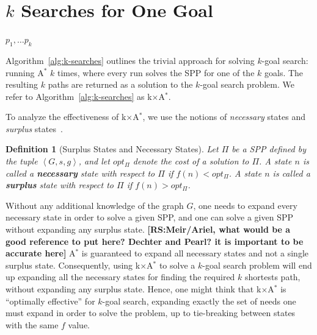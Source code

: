 \documentclass{aicom2e}
\newtheorem{definition}{Definition}
\newcommand{\kgs}{$k$-goal search}
\newcommand{\astar}{A$^*$}
\newcommand{\kxastar}{k$\times$A$^*$}
\newcommand{\tuple}[1]{\ensuremath{\left \langle #1 \right \rangle }}
\newcommand{\roni}[1]{\textbf{[RS:#1]}}
\begin{document}
\section{$k$ Searches for One Goal}
\label{sec:k-one-goal}
\begin{algorithm2e}[t!]
	\small
	\For{$i$=1 to $k$}{
		$p_i\gets$ \astar{}($s$,$g_i$)\\
	}
	\Return $p_1,\ldots p_k$\\	
	\caption{\kxastar{}: \kgs{} with $k$ \astar{}s}
	\label{alg:k-searches}
\end{algorithm2e}



Algorithm~\ref{alg:k-searches} outlines the trivial approach for solving \kgs{}: running \astar{} $k$ times, where every run solves the SPP for one of the $k$ goals. The resulting $k$ paths are returned as a solution to the \kgs{} problem. We refer to Algorithm~\ref{alg:k-searches} as \kxastar{}. 


To analyze the effectiveness of \kxastar{}, we use the notions of {\em necessary} states and {\em surplus} states~\cite{goldenberg2014enhanced}. 

\begin{definition}[Surplus States and Necessary States]
	Let $\Pi$ be a SPP defined by the tuple $\tuple{G,s,g}$, and let $opt_\Pi$ denote the cost of a solution to $\Pi$. 
	A state $n$ is called a {\bf necessary} state with respect to $\Pi$ if $f(n)<opt_\Pi$. 
	A state $n$ is called a {\bf surplus} state with respect to $\Pi$ if $f(n)>opt_\Pi$. 
\label{def:surplus}
\end{definition}
Without any additional knowledge of the graph $G$, one needs to expand every necessary state in order to solve a given SPP, 
and one can solve a given SPP without expanding any surplus state. \roni{Meir/Ariel, what would be a good reference to put here? Dechter and Pearl? it is important to be accurate here}
\astar{} is guaranteed to expand all necessary states and not a single surplus state. Consequently, 
using \kxastar{} to solve a \kgs{} problem will end up expanding all the necessary states 
for finding the required $k$ shortests path, without expanding any surplus state. 
Hence, one might think that \kxastar{} is ``optimally effective'' for \kgs{}, 
expanding exactly the set of needs one must expand in order to solve the problem, up to tie-breaking between states with the same $f$ value. 
\end{document}
